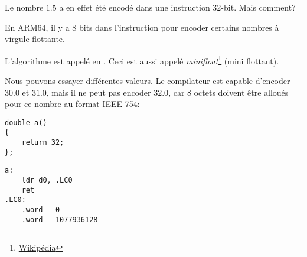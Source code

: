 Le nombre $1.5$ a en effet été encodé dans une instruction 32-bit.
Mais comment?

En ARM64, il y a 8 bits dans l'instruction  pour encoder certains nombres
à virgule flottante.

L'algorithme est appelé  en \ARMSixFourRefURL.
Ceci est aussi appelé \emph{minifloat}\footnote{\href{http://go.yurichev.com/17139}{Wikipédia}}
(mini flottant).

Nous pouvons essayer différentes valeurs. Le compilateur est capable d'encoder $30.0$
et $31.0$, mais il ne peut pas encoder $32.0$, car 8 octets doivent être alloués
pour ce nombre au format IEEE 754:

\begin{lstlisting}[style=customc]
double a()
{
	return 32;
};
\end{lstlisting}

\begin{lstlisting}[caption=GCC 4.9.1 -O3,style=customasmARM]
a:
	ldr	d0, .LC0
	ret
.LC0:
	.word	0
	.word	1077936128
\end{lstlisting}
